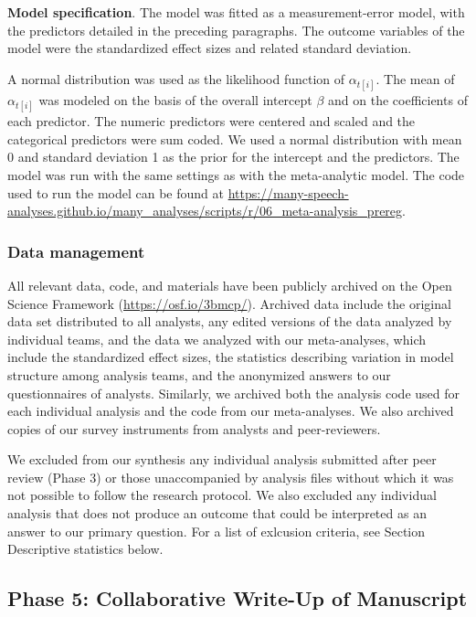 \documentclass[Review,times,sageh]{sagej}
\begin{document}
\textbf{Model specification}. The model was fitted as a measurement-error model, with the predictors detailed in the preceding paragraphs.
The outcome variables of the model were the standardized effect sizes and related standard deviation.

A normal distribution was used as the likelihood function of \(\alpha_{t[i]}\).
The mean of \(\alpha_{t[i]}\) was modeled on the basis of the overall intercept \(\beta\) and on the coefficients of each predictor.
The numeric predictors were centered and scaled and the categorical predictors were sum coded.
We used a normal distribution with mean 0 and standard deviation 1 as the prior for the intercept and the predictors.
The model was run with the same settings as with the meta-analytic model.
The code used to run the model can be found at \url{https://many-speech-analyses.github.io/many_analyses/scripts/r/06_meta-analysis_prereg}.

\hypertarget{ana-archive}{%
\subsubsection{Data management}\label{ana-archive}}

All relevant data, code, and materials have been publicly archived on the Open Science Framework (\url{https://osf.io/3bmcp/}).
Archived data include the original data set distributed to all analysts, any edited versions of the data analyzed by individual teams, and the data we analyzed with our meta-analyses, which include the standardized effect sizes, the statistics describing variation in model structure among analysis teams, and the anonymized answers to our questionnaires of analysts.
Similarly, we archived both the analysis code used for each individual analysis and the code from our meta-analyses.
We also archived copies of our survey instruments from analysts and peer-reviewers.

We excluded from our synthesis any individual analysis submitted after peer review (Phase 3) or those unaccompanied by analysis files without which it was not possible to follow the research protocol.
We also excluded any individual analysis that does not produce an outcome that could be interpreted as an answer to our primary question.
For a list of exlcusion criteria, see Section Descriptive statistics below.

\hypertarget{phase-5-collaborative-write-up-of-manuscript}{%
\subsection{Phase 5: Collaborative Write-Up of Manuscript}\label{phase-5-collaborative-write-up-of-manuscript}}
\end{document}
